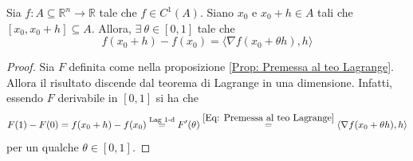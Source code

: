 \begin{theorem}[Lagrange] \label{Teo: Lagrange}
    Sia $f: A \subseteq \mathbb{R}^n \to \mathbb{R}$ tale che $f \in C^1(A)$. Siano $x_0$ e $x_0+h \in A$ tali che $[x_0, x_0+h] \subseteq A$. Allora, $\exists\ \theta \in [0,1]$ tale che
    \begin{equation}
        f(x_0+h)-f(x_0)= \langle \nabla f(x_0+ \theta h), h \rangle
    \end{equation}
    \begin{proof}
        Sia $F$ definita come nella proposizione \ref{Prop: Premessa al teo Lagrange}. Allora il risultato discende dal teorema di Lagrange in una dimensione. Infatti, essendo $F$ derivabile in $[0,1]$ si ha che
        \begin{equation}
            F(1)-F(0)=f(x_0+h)-f(x_0)\overset{\text{Lag 1-d}}{=}F'(\theta)\overset{\eqref{Eq: Premessa al teo Lagrange}}{=}\langle \nabla f(x_0+ \theta h), h \rangle
        \end{equation}
        per un qualche $\theta \in [0,1]$.
    \end{proof} 
\end{theorem}
